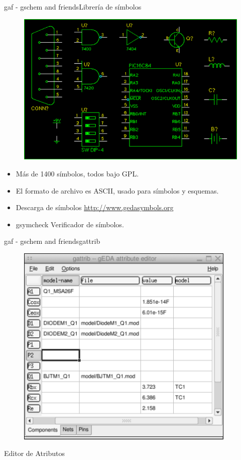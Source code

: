 \documentclass{beamer}
\begin{document}
\begin{frame}{gaf - gschem and friends}{Librería de símbolos}
  \begin{figure}[!h]
    \centering
    \includegraphics[scale=0.25]{img/simbolos.png}
  \end{figure}
  \begin{itemize}
  \item Más de 1400 símbolos, todos bajo GPL.
  \item El formato de archivo es ASCII, usado para símbolos y esquemas.
  \item Descarga de símbolos \url{http://www.gedasymbols.org}
  \item \alert{gsymcheck} Verificador de símbolos.
  \end{itemize}
\end{frame}

\begin{frame}{gaf - gschem and friends}{gattrib}
  \begin{figure}[!h]
    \centering
    \includegraphics[scale=0.4]{img/gattrib.png}
  \end{figure}
  Editor de Atributos
\end{frame}
\end{document}
